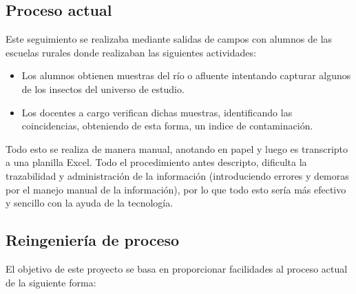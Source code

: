     \subsection{Proceso actual}

      Este seguimiento se realizaba mediante salidas de campos con alumnos de las escuelas rurales donde realizaban las siguientes actividades:
      
      \begin{itemize}
        \item Los alumnos obtienen muestras del río o afluente intentando capturar algunos de los insectos del universo de estudio.
        
        \item Los docentes a cargo verifican dichas muestras, identificando las coincidencias, obteniendo de esta forma, un indice de contaminación.  
      \end{itemize}
      
      Todo esto se realiza de manera manual, anotando en papel y luego es transcripto a una planilla Excel.
      Todo el procedimiento antes descripto, dificulta la trazabilidad y administración de la información (introduciendo errores y demoras por el manejo manual de la información), por lo que todo esto sería más efectivo y sencillo con la ayuda de la tecnología. \newpage

    \subsection{Reingeniería de proceso}

      El objetivo de este proyecto se basa en proporcionar facilidades al proceso actual de la siguiente forma: 

